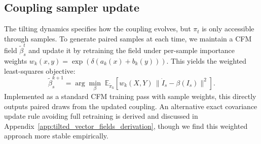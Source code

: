 \documentclass[11pt]{article}
\theoremstyle{definition}
\numberwithin{equation}{section}%
\begin{document}



\subsection{Coupling sampler update}
\label{subsec:sampling_along_tilting}
The tilting dynamics specifies how the coupling evolves, but $\pi_t$ is only accessible through samples.
To generate paired samples at each time, we maintain a CFM field $\tilde\beta_s^t$ and update it by retraining the field under per-sample importance weights $w_k(x,y)=\exp(\delta(a_k(x)+b_k(y)))$.
This yields the weighted least-squares objective:
\begin{equation}
\label{eq:weighted_cfm_lsq}
\tilde\beta^{k+1}_s = \arg\min_{\beta}\;
\mathbb{E}_{\tilde{\pi}_k}\!\left[w_k(X,Y)\,\bigl\|\dot I_s-\beta(I_s)\bigr\|^2\right].
\end{equation}
Implemented as a standard CFM training pass with sample weights, this directly outputs paired draws from the updated coupling.
An alternative exact covariance update rule avoiding full retraining is derived and discussed in Appendix~\ref{app:tilted_vector_fields_derivation}, though we find this weighted approach more stable empirically.
\end{document}
